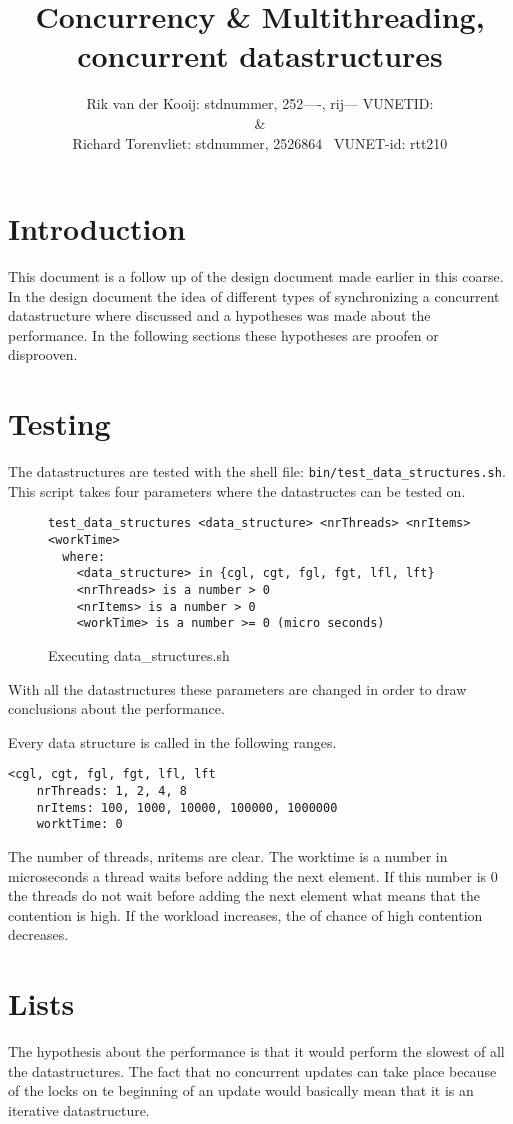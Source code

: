 \documentclass[10pt,a4paper]{article}
\author{Rik van der Kooij: stdnummer, 252----, rij--- VUNETID: \\ \&  \\ Richard Torenvliet: stdnummer, 2526864 \ VUNET-id: rtt210}
\title{Concurrency \& Multithreading, concurrent datastructures}
\begin{document}
\maketitle
\tableofcontents
\section{Introduction}
This document is a follow up of the design document made earlier in this coarse. In the design document the idea of different types of synchronizing a concurrent datastructure where discussed and a hypotheses was made about the performance. In the following sections these hypotheses are proofen or disprooven.

\section{Testing}
The datastructures are tested with the shell file: \texttt{bin/test\_data\_structures.sh}. This script takes four parameters where the datastructes can be tested on.

\begin{figure}
\center
\begin{lstlisting}
test_data_structures <data_structure> <nrThreads> <nrItems> <workTime>
  where:
    <data_structure> in {cgl, cgt, fgl, fgt, lfl, lft}
    <nrThreads> is a number > 0
    <nrItems> is a number > 0
    <workTime> is a number >= 0 (micro seconds)
\end{lstlisting}
\caption{Executing data\_structures.sh}
\end{figure}

With all the datastructures these parameters are changed in order to draw conclusions about the performance. 

Every data structure is called in the following ranges.
\begin{lstlisting}
<cgl, cgt, fgl, fgt, lfl, lft
	nrThreads: 1, 2, 4, 8
	nrItems: 100, 1000, 10000, 100000, 1000000
	worktTime: 0
\end{lstlisting}

The number of threads, nritems are clear. The worktime is a number in microseconds a thread waits before adding the next element. If this number is 0 the threads do not wait before adding the next element what means that the contention is high. If the workload increases, the of chance of high contention decreases.

\section{Lists}
The hypothesis about the performance is that it would perform the slowest of all the datastructures. The fact that no concurrent updates can take place because of the locks on te beginning of an update would basically mean that it is an iterative datastructure. 
\end{document}

